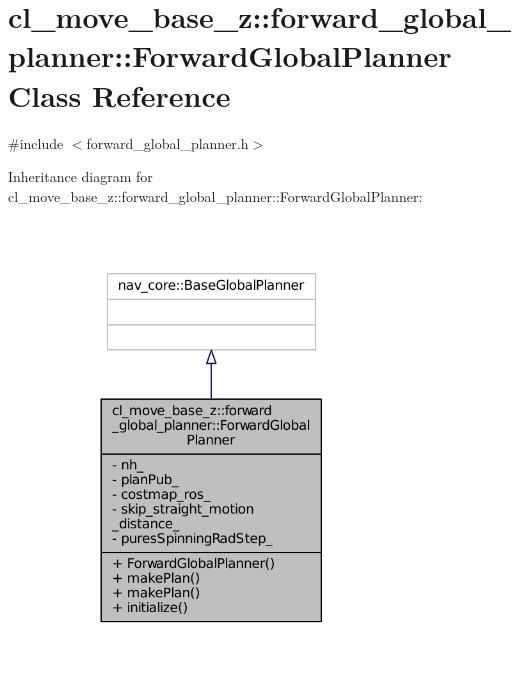\hypertarget{classcl__move__base__z_1_1forward__global__planner_1_1ForwardGlobalPlanner}{}\section{cl\+\_\+move\+\_\+base\+\_\+z\+:\+:forward\+\_\+global\+\_\+planner\+:\+:Forward\+Global\+Planner Class Reference}
\label{classcl__move__base__z_1_1forward__global__planner_1_1ForwardGlobalPlanner}


{\ttfamily \#include $<$forward\+\_\+global\+\_\+planner.\+h$>$}



Inheritance diagram for cl\+\_\+move\+\_\+base\+\_\+z\+:\+:forward\+\_\+global\+\_\+planner\+:\+:Forward\+Global\+Planner\+:
\nopagebreak
\begin{figure}[H]
\begin{center}
\leavevmode
\includegraphics[width=245pt]{classcl__move__base__z_1_1forward__global__planner_1_1ForwardGlobalPlanner__inherit__graph}
\end{center}
\end{figure}


